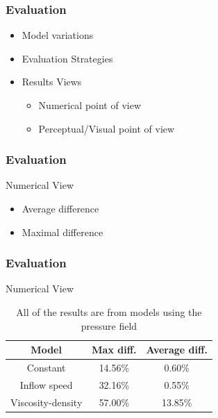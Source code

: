 \documentclass[18pt, xcolor=table]{beamer}
\begin{document}
\begin{frame}[t]
  \frametitle{Evaluation}
  \begin{itemize}
  \item Model variations
  \item Evaluation Strategies
  \item Results Views
    \begin{itemize}
    \item Numerical point of view
    \item Perceptual\slash Visual point of view
    \end{itemize}
  \end{itemize}
\end{frame}

\begin{frame}[t]
  \frametitle{Evaluation}
  \large{Numerical View}
  \begin{itemize}
  \item Average difference
  \item Maximal difference
  \end{itemize}
\end{frame}

\begin{frame}[t]
  \frametitle{Evaluation}
  \large{Numerical View}
  \vspace{1.5cm}
  \begin{center}
    \begin{table}
      \begin{tabular}{|c|c|c|}
        \hline
        \rowcolor{blue!50}
        \textbf{Model}    & \textbf{Max diff.} & \textbf{Average diff.} \\
        \hline
        Constant          & 14.56\% & 0.60\%  \\
        Inflow speed      & 32.16\% & 0.55\%  \\
        Viscosity-density & 57.00\% & 13.85\% \\
        \hline
      \end{tabular}
      \caption{All of the results are from models using the pressure field}
    \end{table}
  \end{center}

\end{frame}
\end{document}
